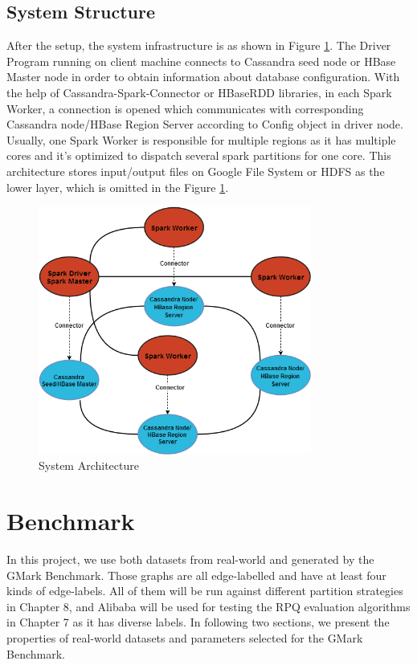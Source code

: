 \subsection{System Structure}
After the setup, the system infrastructure is as shown in Figure \ref{fig:system-infra}. The Driver Program running on client machine connects to Cassandra seed node or HBase Master node in order to obtain information about database configuration. With the help of Cassandra-Spark-Connector\cite{spark-cassandra-connector} or HBaseRDD\cite{spark-hbase-connector} libraries, in each Spark Worker, a connection is opened which communicates with corresponding Cassandra node/HBase Region Server according to Config object in driver node. Usually, one Spark Worker is responsible for multiple regions as it has multiple cores and it's optimized to dispatch several spark partitions for one core. This architecture stores input/output files on Google File System or HDFS as the lower layer, which is omitted in the Figure \ref{fig:system-infra}.\\
\begin{figure}[h!]
  \caption{System Architecture}
  \label{fig:system-infra}
  \centering
    \includegraphics[width=0.8\textwidth]{img/system-architecture}
\end{figure}
\section{Benchmark}
In this project, we use both datasets from real-world and generated by the GMark Benchmark. Those graphs are all edge-labelled and have at least four kinds of edge-labels. All of them will be run against different partition strategies in Chapter 8, and Alibaba will be used for testing the RPQ evaluation algorithms in Chapter 7 as it has diverse labels. In following two sections, we present the properties of real-world datasets and parameters selected for the GMark Benchmark.
